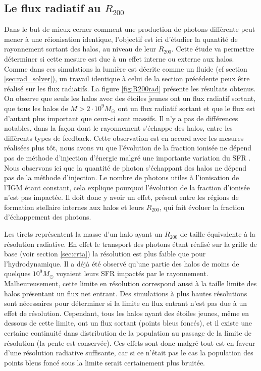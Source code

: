 
\subsection{Le flux radiatif au $R_{200}$}
\label{sec:radflow}

Dans le but de mieux cerner comment une production de photons différente peut mener à une réionisation identique, l'objectif est ici d'étudier la quantité de rayonnement sortant des halos, au niveau de leur $R_{200}$.
Cette étude va permettre déterminer si cette mesure est due à un effet interne ou externe aux halos.
Comme dans ces simulations la lumière est décrite comme un fluide (cf section \autoref{sec:rad_solver}), un travail identique à celui de la section précédente peux être réalisé sur les flux radiatifs.
La figure \ref{fig:R200rad} présente les résultats obtenus.
On observe que seuls les halos avec des étoiles jeunes ont un flux radiatif sortant, que tous les halos de $M>2 \cdot 10^9 M_\odot$ ont un flux radiatif sortant et que le flux est d'autant plus important que ceux-ci sont massifs.
Il n'y a pas de différences notables, dans la façon dont le rayonnement s'échappe des halos, entre les différents types de feedback.
Cette observation est en accord avec les mesures réalisées plus tôt, nous avons vu que l'évolution de la fraction ionisée ne dépend pas de  méthode d'injection d'énergie malgré une importante variation du \ac{SFR} .
Nous observons ici que la quantité de photon s'échappant des halos ne dépend pas de la méthode d'injection.
Le nombre de photons utiles à l'ionisation de l'\ac{IGM} étant constant, cela explique pourquoi l’évolution de la fraction d'ionisée n'est pas impactée.
Il doit donc y avoir un effet, présent entre les régions de formation stellaire internes aux halos et leurs $R_{200}$, qui fait évoluer la fraction d'échappement des photons.

Les tirets représentent la masse d'un halo ayant un $R_{200}$ de taille équivalente à la résolution radiative.
En effet le transport des photons étant réalisé sur la grille de base (voir section \ref{sec:crta}) la résolution est plus faible que pour l'hydrodynamique.
Il a déjà été observé qu'une partie des halos de moins de quelques $10^9 M_\odot$ voyaient leurs \ac{SFR} impactés par le rayonnement. %
Malheureusement, cette limite en résolution correspond aussi à la taille limite des halos présentant un flux net entrant.
Des simulations à plus hautes résolutions sont nécessaires pour déterminer si la limite en flux entrant n'est pas due à un effet de résolution.
Cependant, tous les halos ayant des étoiles jeunes, même en dessous de cette limite, ont un flux sortant (points bleus foncés), et il existe une certaine continuité dans distribution de la population  au passage de la limite de résolution (la pente est conservée).
Ces effets sont donc malgré tout est en faveur d'une résolution radiative suffisante, car si ce n'était pas le cas la population des points bleus foncé sous la limite serait certainement plus bruitée.

